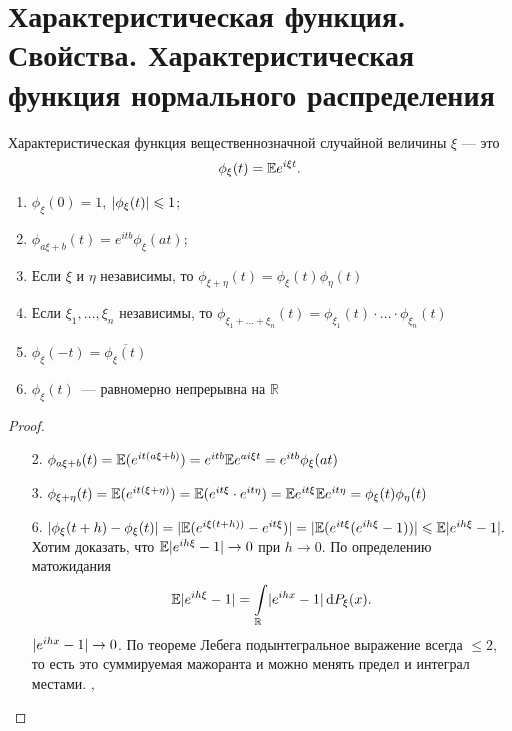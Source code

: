 \section{Характеристическая функция. Свойства. Характеристическая функция нормального распределения}

\begin{definition} Характеристическая функция вещественнозначной случайной величины $\xi$ --- это
    $$\phi_\xi(t) = \mathbb{E} e^{i\xi t}.$$
\end{definition}

\begin{properties}
\enewline
    \begin{enumerate}
        \item $\phi_\xi(0) = 1$, $\lvert\phi_\xi(t)\rvert\leqslant 1$;

        \item $\phi_{a\xi + b}(t) = e^{itb}\phi_\xi (at)$;
             
        \item Если $\xi$ и $\eta$ независимы, то $\phi_{\xi + \eta}(t) = \phi_\xi(t)\phi_\eta(t)$

        \item Если $\xi_1, \ldots, \xi_n$ независимы, то $\phi_{\xi_1 + \ldots + \xi_n}(t) = \phi_{\xi_1}(t)\cdot\ldots\cdot \phi_{\xi_n}(t)$

        \item $\phi_\xi(-t) = \overline{\phi_\xi(t)}$

        \item $\phi_\xi(t)$~--- равномерно непрерывна на $\mathbb{R}$

    \end{enumerate}
\end{properties}

\begin{proof}
\enewline
\begin{enumerate}
    \item[2.] $\phi_{a\xi + b}(t) = \mathbb{E} (e^{it(a\xi + b)}) = e^{itb}\mathbb{E} e^{ai\xi t} = e^{itb}\phi_\xi(at)$
    \item[3.]  $\phi_{\xi + \eta}(t) = \mathbb{E} (e^{it(\xi + \eta)}) = \mathbb{E} (e^{it\xi}\cdot e^{it\eta}) = \mathbb{E} e^{it\xi}\mathbb{E} e^{it\eta} = \phi_\xi(t)\phi_\eta(t)$
    \item[6.]  $\lvert\phi_\xi(t + h) -\phi_\xi(t)\rvert = \lvert\mathbb{E} (e^{i\xi(t+h))} - e^{it\xi})\rvert = \lvert\mathbb{E} (e^{it\xi}(e^{ih\xi} - 1))\rvert \leqslant \mathbb{E} \lvert e^{ih\xi} - 1\rvert.$
    Хотим доказать, что $\mathbb{E} \lvert e^{ih\xi} - 1\rvert \to 0$ при $h \to 0$. По определению матожидания
    $$\EE \abs{e^{ih\xi} - 1} = \int\limits_\mathbb{R}\abs{e^{ihx} - 1}\dd P_\xi(x).$$
    $\lvert e^{ihx} - 1\rvert \to 0$. По теореме Лебега подынтегральное выражение всегда $\le 2$, то есть это суммируемая мажоранта и можно менять предел и интеграл местами. ,
    \qedhere
\end{enumerate}
\end{proof}


